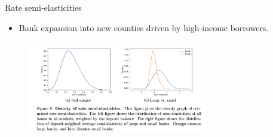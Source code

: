 \documentclass[notes,10pt, aspectratio=169]{beamer}
\begin{document}




\begin{frame}{Rate semi-elasticities}

    \begin{itemize}
    \item Bank expansion into new counties driven by high-income borrowers.
    \end{itemize}
        \begin{figure}
            \centering
            \includegraphics[width=0.7\textwidth]{imgs/fig9_foot.png}
        \end{figure}
        
    \end{frame}
    
    
\end{document}
